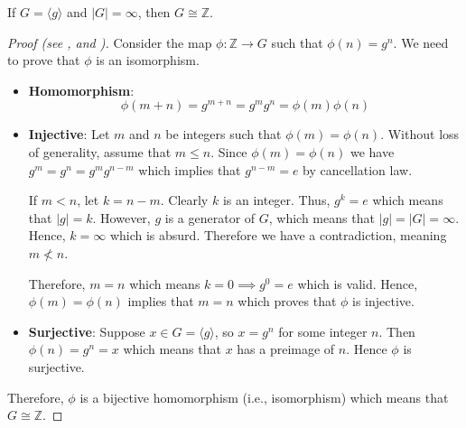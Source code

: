 \begin{theorem}
    If $G = \langle g \rangle$ and $|G| = \infty$, then $G \cong \mathbb{Z}$.
\end{theorem}
\begin{proof}[Proof (see \cite{proofwiki_infinitecyclicgrp}, and {\cite[\S 3.4 Theorem 1]{cohn_1982}})]
    Consider the map $\phi: \mathbb{Z} \to G$ such that $\phi(n) = g^n$. We need to prove that $\phi$ is an isomorphism.
    \begin{itemize}
        \item \textbf{Homomorphism}:
        \[
            \phi(m+n) = g^{m+n} = g^mg^n = \phi(m)\phi(n)
        \]

        \item \textbf{Injective}: Let $m$ and $n$ be integers such that $\phi(m) = \phi(n)$. Without loss of generality, assume that $m \leq n$. Since $\phi(m) = \phi(n)$ we have $g^m = g^n = g^mg^{n-m}$ which implies that $g^{n-m} = e$ by cancellation law.

        If $m < n$, let $k = n - m$. Clearly $k$ is an integer. Thus, $g^k = e$ which means that $|g| = k$. However, $g$ is a generator of $G$, which means that $|g| = |G| = \infty$. Hence, $k = \infty$ which is absurd. Therefore we have a contradiction, meaning $m \not< n$.

        Therefore, $m = n$ which means $k = 0 \implies g^0 = e$ which is valid. Hence, $\phi(m) = \phi(n)$ implies that $m = n$ which proves that $\phi$ is injective.

        \item \textbf{Surjective}: Suppose $x \in G = \langle g\rangle$, so $x = g^n$ for some integer $n$. Then $\phi(n) = g^n = x$ which means that $x$ has a preimage of $n$. Hence $\phi$ is surjective.
    \end{itemize}

    Therefore, $\phi$ is a bijective homomorphism (i.e., isomorphism) which means that $G \cong \mathbb{Z}$.
\end{proof}

\newpage

